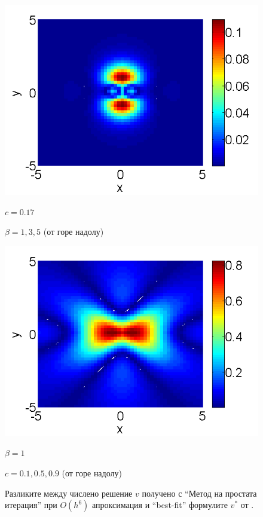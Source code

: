 \documentclass[a4paper]{article}
\theoremstyle{remark}
\begin{document}
\begin{figure}[htbp]
\begin{minipage}[b]{0.48\linewidth}
		 \includegraphics[width=\linewidth]{BestFitVsSimpleIter/ChristovIC_50_bt5_c017_h02_O(h^6).png}
		\centerline{$c=0.17$}
		\centerline{$\beta = 1,3,5$ (от горе надолу) }
	\end{minipage}
	\begin{minipage}[b]{0.48\linewidth}
		\raggedright
		 \includegraphics[width=\linewidth]{BestFitVsSimpleIter/ChristovIC_50_bt1_c090_h02_O(h^6).png}
		\centerline{$\beta = 1$}
		\centerline{$c = 0.1, 0.5, 0.9$ (от горе надолу)}
	\end{minipage}
	\caption{Разликите между числено решение $v$ получено с ``Метод на простата итерация'' при $O(h^6)$ апроксимация и ``best-fit'' формулите $v^*$ от \cite{Ch2011}. }
	\label{fig:difference}
\end{figure}
\end{document}
